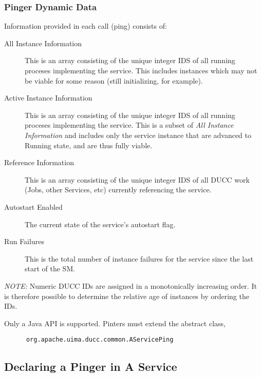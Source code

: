       \subsubsection{Pinger Dynamic Data}

      Information provided in each call (ping) consists of:
      \begin{description}
        \item[All Instance Information] This is an array consisting of the unique integer
          IDS of all running proceses implementing the service.  This includes instances
          which may not be viable for some reason (still initializing, for example).

        \item[Active Instance Information] This is an array consisting of the unique integer
          IDS of all running proceses implementing the service.  This is a subset of 
          {\em All Instance Information} and includes only the service instance that are advanced
          to Running state, and are thus fully viable.

        \item[Reference Information] This is an array consisting of the unique integer
          IDS of all DUCC work (Jobs, other Services, etc) currently referencing the
          service.  
          
        \item[Autostart Enabled] The current state of the service's autostart flag.
          
        \item[Run Failures] This is the total number of instance failures for the 
          service since the last start of the SM.
      \end{description}

      {\em NOTE:} Numeric DUCC IDs are assigned in a monotonically increasing
      order.  It is therefore possible to determine the relative age of instances by
      ordering the IDs.


      Only a Java API is supported.  Pinters must extend the abstract class,
\begin{verbatim}
      org.apache.uima.ducc.common.AServicePing
\end{verbatim}

      \subsection{Declaring a Pinger in A Service}

